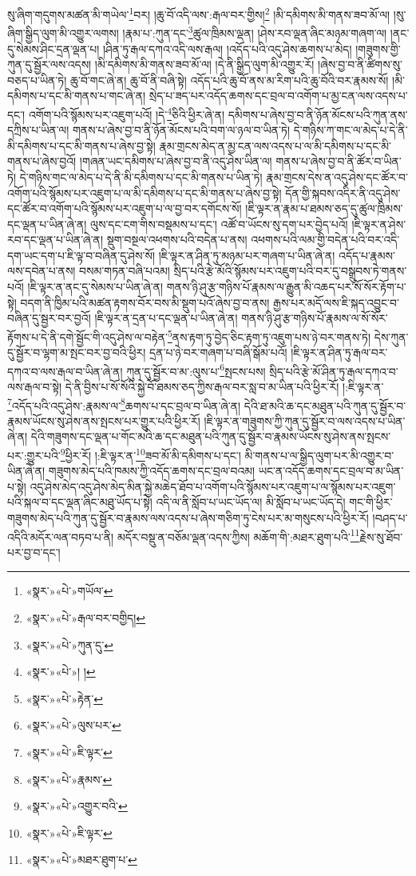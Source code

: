 སུ་ཞིག་གདུགས་མཚན་མི་གཡེལ་\footnote{«སྣར་»«པེ་»གཡོལ་}བར། །ཆུ་བོ་འདི་ལས་:རྒལ་བར་གྱིས།\footnote{«སྣར་»«པེ་»རྒལ་བར་བགྱིད།} །མི་དམིགས་མི་གནས་ཟབ་མོ་ལ། །སུ་ཞིག་སྒྱིད་ལུག་མི་འགྱུར་ལགས། །རྣམ་པ་:ཀུན་དང་\footnote{«སྣར་»«པེ་»ཀུན་དུ་}ཚུལ་ཁྲིམས་ལྡན། །ཤེས་རབ་ལྡན་ཞིང་མཉམ་གཞག་ལ། །ནང་དུ་སེམས་ཤིང་དྲན་ལྡན་པ། །ཤིན་ཏུ་རྒལ་དཀའ་འདི་ལས་རྒལ། །འདོད་པའི་འདུ་ཤེས་ཆགས་པ་མེད། །གཟུགས་གྱི་ཀུན་དུ་སྦྱོར་ལས་འདས། །མི་དམིགས་མི་གནས་ཟབ་མོ་ལ། །དེ་ནི་སྒྱིད་ལུག་མི་འགྱུར་རོ། །ཞེས་བྱ་བ་ནི་ཚིགས་སུ་བཅད་པ་ཡིན་ཏེ། ཆུ་བོ་གང་ཞེ་ན། ཆུ་བོ་ནི་བཞི་སྟེ། འདོད་པའི་ཆུ་བོ་ནས་མ་རིག་པའི་ཆུ་བོའི་བར་རྣམས་སོ། །མི་དམིགས་པ་དང་མི་གནས་པ་གང་ཞེ་ན། སྲེད་པ་ཟད་པར་འདོད་ཆགས་དང་བྲལ་བ་འགོག་པ་མྱ་ངན་ལས་འདས་པ་དང་། འགོག་པའི་སྙོམས་པར་འཇུག་པའོ། །དེ་\footnote{«སྣར་»«པེ་»། །}ཅིའི་ཕྱིར་ཞེ་ན། དམིགས་པ་ཞེས་བྱ་བ་ནི་ཉོན་མོངས་པའི་ཀུན་ནས་དཀྲིས་པ་ཡིན་ལ། གནས་པ་ཞེས་བྱ་བ་ནི་ཉོན་མོངས་པའི་བག་ལ་ཉལ་བ་ཡིན་ཏེ། དེ་གཉིས་ཀ་གང་ལ་མེད་པ་དེ་ནི་མི་དམིགས་པ་དང་མི་གནས་པ་ཞེས་བྱ་སྟེ། རྣམ་གྲངས་མེད་ན་མྱ་ངན་ལས་འདས་པ་ལ་མི་དམིགས་པ་དང་མི་གནས་པ་ཞེས་བྱའོ། །གཞན་ཡང་དམིགས་པ་ཞེས་བྱ་བ་ནི་འདུ་ཤེས་ཡིན་ལ། གནས་པ་ཞེས་བྱ་བ་ནི་ཚོར་བ་ཡིན་ཏེ། དེ་གཉིས་གང་ལ་མེད་པ་དེ་ནི་མི་དམིགས་པ་དང་མི་གནས་པ་ཡིན་ཏེ། རྣམ་གྲངས་དེས་ན་འདུ་ཤེས་དང་ཚོར་བ་འགོག་པའི་སྙོམས་པར་འཇུག་པ་ལ་མི་དམིགས་པ་དང་མི་གནས་པ་ཞེས་བྱ་སྟེ། དོན་གྱི་སྐབས་འདིར་ནི་འདུ་ཤེས་དང་ཚོར་བ་འགོག་པའི་སྙོམས་པར་འཇུག་པ་ལ་བྱ་བར་དགོངས་སོ། །ཇི་ལྟར་ན་རྣམ་པ་ཐམས་ཅད་དུ་ཚུལ་ཁྲིམས་དང་ལྡན་པ་ཡིན་ཞེ་ན། ལུས་དང་ངག་གིས་བསྡམས་པ་དང་། འཚོ་བ་ཡོངས་སུ་དག་པར་བྱེད་པའོ། །ཇི་ལྟར་ན་ཤེས་རབ་དང་ལྡན་པ་ཡིན་ཞེ་ན། སྡུག་བསྔལ་འཕགས་པའི་བདེན་པ་ནས། འཕགས་པའི་ལམ་གྱི་བདེན་པའི་བར་འདི་དག་ཡང་དག་པ་ཇི་ལྟ་བ་བཞིན་དུ་ཤེས་སོ། །ཇི་ལྟར་ན་ཤིན་ཏུ་མཉམ་པར་གཞག་པ་ཡིན་ཞེ་ན། འདོད་པ་རྣམས་ལས་དབེན་པ་ནས། བསམ་གཏན་བཞི་པའམ། སྲིད་པའི་རྩེ་མོའི་སྙོམས་པར་འཇུག་པའི་བར་དུ་བསྒྲུབས་ཏེ་གནས་པའོ། །ཇི་ལྟར་ན་ནང་དུ་སེམས་པ་ཡིན་ཞེ་ན། གནས་ཉི་ཤུ་རྩ་གཉིས་པོ་རྣམས་ལ་རྒྱུན་མི་འཆད་པར་སོ་སོར་རྟོག་པ་སྟེ། བདག་ནི་ཁྱིམ་པའི་མཚན་རྟགས་བོར་བས་མི་སྡུག་པའོ་ཞེས་བྱ་བ་ནས། རྒྱས་པར་མདོ་ལས་ཇི་སྐད་འབྱུང་བ་བཞིན་དུ་སྦྱར་བར་བྱའོ། །ཇི་ལྟར་ན་དྲན་པ་དང་ལྡན་པ་ཡིན་ཞེ་ན། གནས་ཉི་ཤུ་རྩ་གཉིས་པོ་རྣམས་ལ་སོ་སོར་རྟོགས་པ་དེ་ནི་དགེ་སྦྱོང་གི་འདུ་ཤེས་ལ་བརྟེན་\footnote{«སྣར་»«པེ་»རྟེན་}ནས་རྟག་ཏུ་བྱེད་ཅིང་རྟག་ཏུ་འཇུག་པས་ཉེ་བར་གནས་ཏེ། དེས་ཀུན་དུ་སྦྱོར་བ་ལྷག་མ་སྤང་བར་བྱ་བའི་ཕྱིར། དྲན་པ་ཉེ་བར་གཞག་པ་བཞི་སྒོམ་པའོ། །ཇི་ལྟར་ན་ཤིན་ཏུ་རྒལ་བར་དཀའ་བ་ལས་རྒལ་བ་ཡིན་ཞེ་ན། ཀུན་དུ་སྦྱོར་བ་མ་:ལུས་པ་\footnote{«སྣར་»«པེ་»ལུས་པར་}སྤངས་པས། སྲིད་པའི་རྩེ་མོ་ཤིན་ཏུ་རྒལ་དཀའ་བ་ལས་རྒལ་བ་སྟེ། དེ་ནི་བྱིས་པ་སོ་སོའི་སྐྱེ་བོ་ཐམས་ཅད་ཀྱིས་རྒལ་བར་སླ་བ་མ་ཡིན་པའི་ཕྱིར་རོ། །:ཇི་ལྟར་ན་\footnote{«སྣར་»«པེ་»ཇི་ལྟར་}འདོད་པའི་འདུ་ཤེས་:རྣམས་ལ་\footnote{«སྣར་»«པེ་»རྣམས་}ཆགས་པ་དང་བྲལ་བ་ཡིན་ཞེ་ན། དེའི་ཐ་མའི་ཆ་དང་མཐུན་པའི་ཀུན་དུ་སྦྱོར་བ་རྣམས་ཡོངས་སུ་ཤེས་ནས་སྤངས་པར་གྱུར་པའི་ཕྱིར་རོ། །ཇི་ལྟར་ན་གཟུགས་ཀྱི་ཀུན་དུ་སྦྱོར་བ་ལས་འདས་པ་ཡིན་ཞེ་ན། དེའི་གཟུགས་དང་ལྡན་པ་གོང་མའི་ཆ་དང་མཐུན་པའི་ཀུན་དུ་སྦྱོར་བ་རྣམས་ཡོངས་སུ་ཤེས་ནས་སྤངས་པར་:གྱུར་པའི་\footnote{«སྣར་»«པེ་»འགྱུར་བའི་}ཕྱིར་རོ། །:ཇི་ལྟར་ན་\footnote{«སྣར་»«པེ་»ཇི་ལྟར་}ཟབ་མོ་མི་དམིགས་པ་དང་། མི་གནས་པ་ལ་སྒྱིད་ལུག་པར་མི་འགྱུར་བ་ཡིན་ཞེ་ན། གཟུགས་མེད་པའི་ཁམས་ཀྱི་འདོད་ཆགས་དང་བྲལ་བའམ། ཡང་ན་འདོད་ཆགས་དང་བྲལ་བ་མ་ཡིན་པ་སྟེ། འདུ་ཤེས་མེད་འདུ་ཤེས་མེད་མིན་སྐྱེ་མཆེད་ཐོབ་པ་འགོག་པའི་སྙོམས་པར་འཇུག་པ་ལ་སྙོམས་པར་འཇུག་པའི་སྐལ་བ་དང་ལྡན་ཞིང་མཐུ་ཡོད་པ་སྟེ། འདི་ལ་ནི་སློབ་པ་ཡང་ཡོད་ལ། མི་སློབ་པ་ཡང་ཡོད་དེ། གང་གི་ཕྱིར་གཟུགས་མེད་པའི་ཀུན་དུ་སྦྱོར་བ་རྣམས་ལས་འདས་པ་ཞེས་གཅིག་ཏུ་ངེས་པར་མ་གསུངས་པའི་ཕྱིར་རོ། །བཤད་པ་འདིའི་མདོར་ལན་བཏབ་པ་ནི། མདོར་བསྡུ་ན་བཅོམ་ལྡན་འདས་ཀྱིས། མཆོག་གི་:མཐར་ཐུག་པའི་\footnote{«སྣར་»«པེ་»མཐར་ཐུག་པ་}རྗེས་སུ་ཐོབ་པར་བྱ་བ་དང་། 